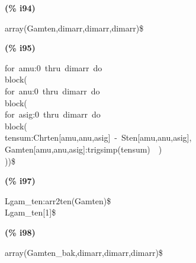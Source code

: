 \documentclass[fleqn]{article}
\begin{document}
\noindent
\begin{minipage}[t]{4.000000em}\color{red}\bfseries
(\% i94)	
\end{minipage}
\begin{minipage}[t]{\textwidth}\color{blue}
array(Gamten,dimarr,dimarr,dimarr)\$
\end{minipage}

\noindent%



\noindent
\begin{minipage}[t]{4.000000em}\color{red}\bfseries
(\% i95)	
\end{minipage}
\begin{minipage}[t]{\textwidth}\color{blue}
for\ amu:0\ thru\ dimarr\ do\\
block(\\
for\ anu:0\ thru\ dimarr\ do\\
block(\\
for\ asig:0\ thru\ dimarr\ do\\
block(\\
tensum:Chrten[amu,anu,asig]\ -\ Sten[amu,anu,asig],\\
Gamten[amu,anu,asig]:trigsimp(tensum)\ \ )\\
))\$
\end{minipage}

\noindent%



\noindent
\begin{minipage}[t]{4.000000em}\color{red}\bfseries
(\% i97)	
\end{minipage}
\begin{minipage}[t]{\textwidth}\color{blue}
Lgam\_ten:arr2ten(Gamten)\$\\
Lgam\_ten[1]\$
\end{minipage}

\noindent%



\noindent
\begin{minipage}[t]{4.000000em}\color{red}\bfseries
(\% i98)	
\end{minipage}
\begin{minipage}[t]{\textwidth}\color{blue}
array(Gamten\_bak,dimarr,dimarr,dimarr)\$
\end{minipage}

\noindent%
\end{document}
